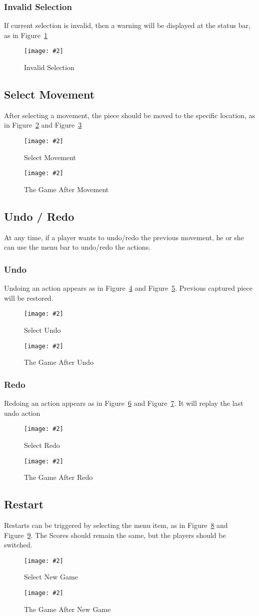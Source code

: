 \documentclass[12pt]{article}
\newcommand{\img}[3]{
\begin{figure}[!ht]
\begin{center}
\texttt{[image: \#2]}
\caption{#3}\label{#2}
\end{center}
\end{figure}
}
\begin{document}
\subsubsection{Invalid Selection}
If current selection is invalid, then a warning will be displayed at the status bar, as in Figure~\ref{board_invalid_selection}
\img{0.4}{board_invalid_selection}{Invalid Selection}

\subsection{Select Movement}
After selecting a movement, the piece should be moved to the specific location, as in Figure~\ref{board_select_movement} and Figure~\ref{board_after_movement}
\img{0.4}{board_select_movement}{Select Movement}
\img{0.4}{board_after_movement}{The Game After Movement}


\subsection{Undo / Redo}

At any time, if a player wants to undo/redo the previous movement, he or she can use the menu bar to undo/redo the actions.

\subsubsection{Undo}
Undoing an action appears as in Figure~\ref{board_undo} and Figure~\ref{board_after_undo}. Previous captured piece will be restored.
\img{0.4}{board_undo}{Select Undo}
\img{0.4}{board_after_undo}{The Game After Undo}

\subsubsection{Redo}
Redoing an action appears as in Figure~\ref{board_redo} and Figure~\ref{board_after_redo}. It will replay the last undo action
\img{0.4}{board_redo}{Select Redo}
\img{0.4}{board_after_redo}{The Game After Redo}

\subsection{Restart}
Restarts can be triggered by selecting the menu item, as in Figure~\ref{board_newgame} and Figure~\ref{board_after_newgame}. The Scores should remain the same, but the players should be switched.
\img{0.4}{board_newgame}{Select New Game}
\img{0.4}{board_after_newgame}{The Game After New Game}
\end{document}

